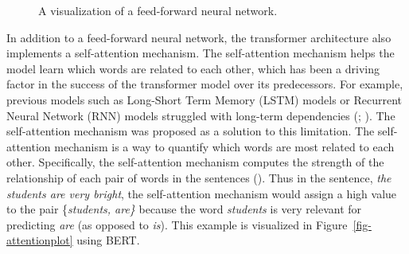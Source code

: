 \documentclass[
  12pt,
  letterpaper,
]{scrreprt}
\begin{document}
\begin{figure}[htbp]

\caption{\label{fig-neuralnet}A visualization of a feed-forward neural
network.}


\end{figure}%

In addition to a feed-forward neural network, the transformer
architecture also implements a self-attention mechanism. The
self-attention mechanism helps the model learn which words are related
to each other, which has been a driving factor in the success of the
transformer model over its predecessors. For example, previous models
such as Long-Short Term Memory (LSTM) models or Recurrent Neural Network
(RNN) models struggled with long-term dependencies
(; ). The self-attention mechanism was proposed as a solution to this
limitation. The self-attention mechanism is a way to quantify which
words are most related to each other. Specifically, the self-attention
mechanism computes the strength of the relationship of each pair of
words in the sentences
(). Thus
in the sentence, \emph{the students are very bright}, the self-attention
mechanism would assign a high value to the pair \{\emph{students, are\}}
because the word \emph{students} is very relevant for predicting
\emph{are} (as opposed to \emph{is}). This example is visualized in
Figure~\ref{fig-attentionplot} using BERT.
\end{document}
